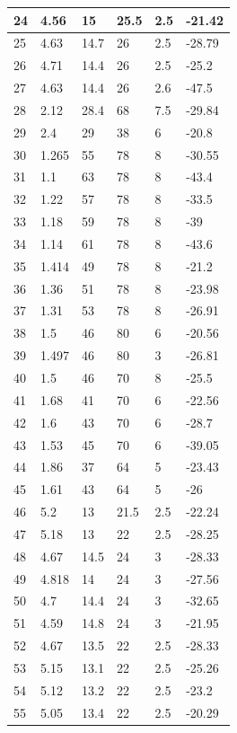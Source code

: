 \documentclass[a4paper,12pt]{report}
\begin{document}
\begin{longtable}{|l|l|l|l|l|l|}
24 & 4.56 & 15 & 25.5 & 2.5 & -21.42 \\ \hline
25 & 4.63 & 14.7 & 26 & 2.5 & -28.79 \\ \hline
26 & 4.71 & 14.4 & 26 & 2.5 & -25.2 \\ \hline
27 & 4.63 & 14.4 & 26 & 2.6 & -47.5 \\ \hline
28 & 2.12 & 28.4 & 68 & 7.5 & -29.84 \\ \hline
29 & 2.4 & 29 & 38 & 6 & -20.8 \\ \hline
30 & 1.265 & 55 & 78 & 8 & -30.55 \\ \hline
31 & 1.1 & 63 & 78 & 8 & -43.4 \\ \hline
32 & 1.22 & 57 & 78 & 8 & -33.5 \\ \hline
33 & 1.18 & 59 & 78 & 8 & -39 \\ \hline
34 & 1.14 & 61 & 78 & 8 & -43.6 \\ \hline
35 & 1.414 & 49 & 78 & 8 & -21.2 \\ \hline
36 & 1.36 & 51 & 78 & 8 & -23.98 \\ \hline
37 & 1.31 & 53 & 78 & 8 & -26.91 \\ \hline
38 & 1.5 & 46 & 80 & 6 & -20.56 \\ \hline
39 & 1.497 & 46 & 80 & 3 & -26.81 \\ \hline
40 & 1.5 & 46 & 70 & 8 & -25.5 \\ \hline
41 & 1.68 & 41 & 70 & 6 & -22.56 \\ \hline
42 & 1.6 & 43 & 70 & 6 & -28.7 \\ \hline
43 & 1.53 & 45 & 70 & 6 & -39.05 \\ \hline
44 & 1.86 & 37 & 64 & 5 & -23.43 \\ \hline
45 & 1.61 & 43 & 64 & 5 & -26 \\ \hline
46 & 5.2 & 13 & 21.5 & 2.5 & -22.24 \\ \hline
47 & 5.18 & 13 & 22 & 2.5 & -28.25 \\ \hline
48 & 4.67 & 14.5 & 24 & 3 & -28.33 \\ \hline
49 & 4.818 & 14 & 24 & 3 & -27.56 \\ \hline
50 & 4.7 & 14.4 & 24 & 3 & -32.65 \\ \hline
51 & 4.59 & 14.8 & 24 & 3 & -21.95 \\ \hline
52 & 4.67 & 13.5 & 22 & 2.5 & -28.33 \\ \hline
53 & 5.15 & 13.1 & 22 & 2.5 & -25.26 \\ \hline
54 & 5.12 & 13.2 & 22 & 2.5 & -23.2 \\ \hline
55 & 5.05 & 13.4 & 22 & 2.5 & -20.29 \\ \hline

\end{longtable}
\end{document}
